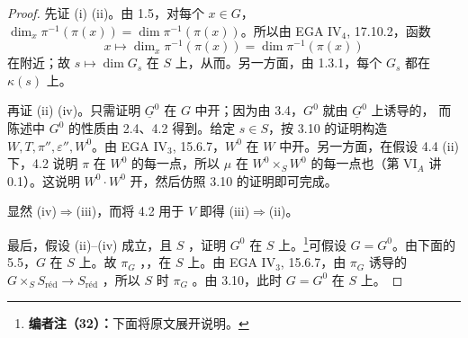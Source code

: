 \begin{proof}
先证 (i)  (ii)。由 1.5，对每个 $x\in G$，$\dim_x\pi^{-1}(\pi(x))=\dim\pi^{-1}(\pi(x))$。所以由 EGA IV$_4$, 17.10.2，函数
\[
x\longmapsto\dim_x\pi^{-1}(\pi(x))=\dim\pi^{-1}(\pi(x))
\]
在附近；故 $s\mapsto\dim G_s$ 在 $S$ 上，从而。另一方面，由 1.3.1，每个 $G_s$ 都在 $\kappa(s)$ 上。

再证 (ii)  (iv)。只需证明 $\underline G^0$ 在 $G$ 中开；因为由 3.4，$G^0$ 就由 $\underline G^0$ 上诱导的，
而陈述中 $G^0$ 的性质由 2.4、4.2 得到。给定 $s\in S$，按 3.10 的证明构造 $W,T,\pi'',\varepsilon'',W^0$。由 EGA IV$_3$, 15.6.7，$W^0$ 在 $W$ 中开。另一方面，在假设 4.4 (ii) 下，4.2 说明 $\pi$ 在 $W^0$ 的每一点，所以 $\mu$ 在 $W^0\times_SW^0$ 的每一点也（第 VI$_A$ 讲 0.1）。这说明 $W^0\cdot W^0$ 开，然后仿照 3.10 的证明即可完成。

显然 (iv)$\Rightarrow$(iii)，而将 4.2 用于 $V$ 即得 (iii)$\Rightarrow$(ii)。

最后，假设 (ii)--(iv) 成立，且 $S$ ，证明 $G^0$ 在 $S$ 上。\footnote{\textbf{编者注（32）：}下面将原文展开说明。}可假设 $G=G^0$。由下面的 5.5，$G$ 在 $S$ 上。故 $\pi_G$ ，，在 $S$ 上。由 EGA IV$_3$, 15.6.7，由 $\pi_G$ 诱导的 $G\times_SS_{\mathrm{r\text{é}d}}\to S_{\mathrm{r\text{é}d}}$ ，所以 $S$ 时 $\pi_G$ 。由 3.10，此时 $G=G^0$ 在 $S$ 上。
\end{proof}

